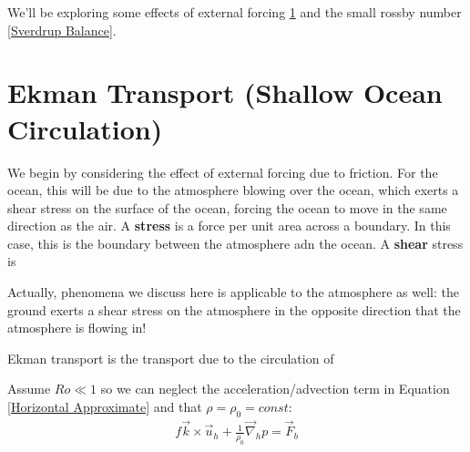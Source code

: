 We'll be exploring some effects of external forcing \ref{Ekman Transport} and the small rossby number \ref{Sverdrup Balance}.

\section{Ekman Transport (Shallow Ocean Circulation)}\label{Ekman Transport}

We begin by considering the effect of external forcing due to friction. For the ocean, this will be due to the atmosphere blowing over the ocean, which exerts a shear stress on the surface of the ocean, forcing the ocean to move in the same direction as the air. A \textbf{stress} is a force per unit area across a boundary. In this case, this is the boundary between the atmosphere adn the ocean. A \textbf{shear} stress is 

Actually, phenomena we discuss here is applicable to the atmosphere as well: the ground exerts a shear stress on the atmosphere in the opposite direction that the atmosphere is flowing in!

Ekman transport is the transport due to the circulation of 

Assume $Ro\ll1$ so we can neglect the acceleration/advection term in Equation \ref{Horizontal Approximate} and that $\rho=\rho_0=const$:
\begin{align*}
    f\vec{k}\times\vec{u}_h+\frac{1}{\rho_0}\vec{\nabla}_h p = \vec{F}_b
\end{align*}

